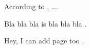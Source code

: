 \documentclass{article}
\begin{document}
    
According to , \dots.

Bla bla bla is bla bla bla \cite{griffiths1997learning, 
    goossens1997latex}.

Hey, I can add page too \cite[p.~32]{lamport1994latex}.



    
\end{document}
